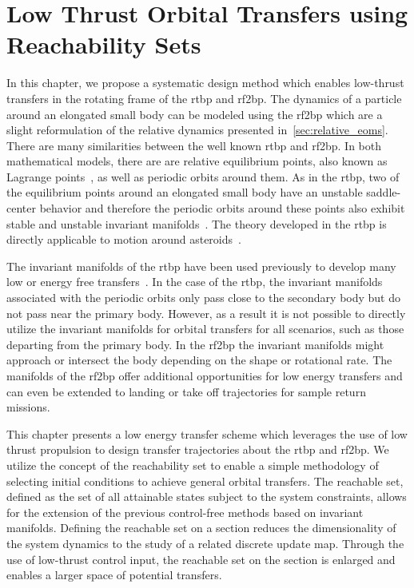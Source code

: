 
\chapter{Low Thrust Orbital Transfers using Reachability Sets}\label{sec:lowthrust_transfers}%

In this chapter, we propose a systematic design method which enables low-thrust transfers in the rotating frame of the \gls{rtbp} and \gls{rf2bp}.
The dynamics of a particle around an elongated small body can be modeled using the \gls{rf2bp} which are a slight reformulation of the relative dynamics presented in~\cref{sec:relative_eoms}.
There are many similarities between the well known \gls{rtbp} and \gls{rf2bp}.
In both mathematical models, there are are relative equilibrium points, also known as Lagrange points~\cite{szebehely1967,scheeres1994}, as well as periodic orbits around them.
As in the \gls{rtbp}, two of the equilibrium points around an elongated small body have an unstable saddle-center behavior and therefore the periodic orbits around these points also exhibit stable and unstable invariant manifolds~\cite{hu2002a,koon2011}.
The theory developed in the \gls{rtbp} is directly applicable to motion around asteroids~\cite{herrera2014}.

The invariant manifolds of the \gls{rtbp} have been used previously to develop many low or energy free transfers~\cite{koon2000b,koon2001}.
In the case of the \gls{rtbp}, the invariant manifolds associated with the periodic orbits only pass close to the secondary body but do not pass near the primary body.
However, as a result it is not possible to directly utilize the invariant manifolds for orbital transfers for all scenarios, such as those departing from the primary body.
In the \gls{rf2bp} the invariant manifolds might approach or intersect the body depending on the shape or rotational rate. 
The manifolds of the \gls{rf2bp} offer additional opportunities for low energy transfers and can even be extended to landing or take off trajectories for sample return missions.

This chapter presents a low energy transfer scheme which leverages the use of low thrust propulsion to design transfer trajectories about the \gls{rtbp} and \gls{rf2bp}.
We utilize the concept of the reachability set to enable a simple methodology of selecting initial conditions to achieve general orbital transfers. 
The reachable set, defined as the set of all attainable states subject to the system constraints, allows for the extension of the previous control-free methods based on invariant manifolds.
Defining the reachable set on a \Poincare section reduces the dimensionality of the system dynamics to the study of a related discrete update map.
Through the use of low-thrust control input, the reachable set on the \Poincare section is enlarged and enables a larger space of potential transfers.


